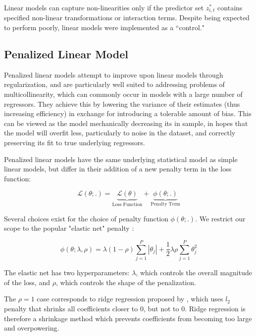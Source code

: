 \documentclass[a4paper, table]{article}
\begin{document}
Linear models can capture non-linearities only if the predictor set \(z^*_{i, t}\) contains specified non-linear transformations or interaction terms. Despite being expected to perform poorly, linear models were implemented as a ``control."

\subsection{Penalized Linear Model}

Penalized linear models attempt to improve upon linear models through regularization, and are particularly well suited to addressing problems of multicollinearity, which can commonly occur in models with a large number of regressors. They achieve this by lowering the variance of their estimates (thus increasing efficiency) in exchange for introducing a tolerable amount of bias. This can be viewed as the model mechanically decreasing its in sample, in hopes that the model will overfit less, particularly to noise in the dataset, and correctly preserving its fit to true underlying regressors.

Penalized linear models have the same underlying statistical model as simple linear models, but differ in their addition of a new penalty term in the loss function:

\begin{equation}
	\mathcal{L(\theta;.)} = 
	\underset{\text{Loss Function}}{\underbrace{\mathcal{L(\theta)}}} + 
	\underset{\text{Penalty Term}}{\underbrace{\phi(\theta;.)}}
\end{equation}

Several choices exist for the choice of penalty function \( \phi(\theta;.) \). We restrict our scope to the popular "elastic net" penalty \citep{zou_regularization_2005}:

\begin{equation}
	\phi(\theta;\lambda,\rho) = 
	\lambda(1-\rho) \sum_{j = 1}^{P}|\theta_j| +
	\frac{1}{2} \lambda \rho \sum_{j = 1}^{P}\theta_j^2
\end{equation}

The elastic net has two hyperparameters: $\lambda$, which controls the overall magnitude of the loss, and $\rho$, which controls the shape of the penalization. 

The $\rho = 1$ case corresponds to ridge regression proposed by \cite{hoerl_ridge_1970}, which uses $l_2$ penalty that shrinks all coefficients closer to 0, but not to 0. Ridge regression is therefore a shrinkage method which prevents coefficients from becoming too large and overpowering. 
\end{document}
